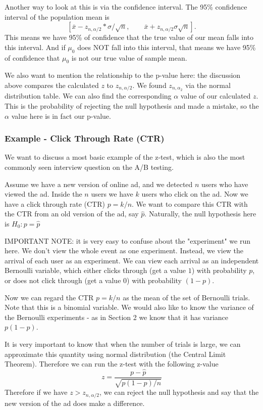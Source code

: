 \documentclass[12pt]{amsart}
\numberwithin{equation}{section}
\theoremstyle{plain}
\theoremstyle{definition}
\begin{document}
Another way to look at this is via the confidence interval. The 95\% confidence interval of the population mean is 
$$
[\bar x-z_{n,\alpha/2}*\sigma/\sqrt{n}, \qquad\bar x+z_{n,\alpha/2}\sigma\sqrt{n}].
$$
This means we have 95\% of confidence that the true value of our mean falls into this interval. And if $\mu_0$ does NOT fall into this interval, that means we have 95\% of confidence that $\mu_0$ is not our true value of sample mean.

We also want to mention the relationship to the p-value here: the discussion above compares the calculated $z$ to $z_{n,\alpha/2}$. We found $z_{n,\alpha_2}$ via the normal distribution table. We can also find the corresponding $\alpha$ value of our calculated $z$. This is the probability of rejecting the null hypothesis and made a mistake, so the $\alpha$ value here is in fact our p-value.

\subsubsection{Example - Click Through Rate (CTR)}

We want to discuss a most basic example of the z-test, which is also the most commonly seen interview question on the A/B testing. 

Assume we have a new version of online ad, and we detected $n$ users who have viewed the ad. Inside the $n$ users we have $k$ users who click on the ad. Now we have a click through rate (CTR) $p = k/n$. We want to compare this CTR with the CTR from an old version of the ad, say $\hat p$. Naturally, the null hypothesis here is $H_0: p = \hat p$

IMPORTANT NOTE: it is very easy to confuse about the "experiment" we run here. We don't view the whole event as one experiment. Instead, we view the arrival of each user as an experiment. We can view each arrival as an independent Bernoulli variable, which either clicks through (get a value $1$) with probability $p$, or does not click through (get a value $0$) with probability $(1-p)$.

Now we can regard the CTR $p = k/n$ as the mean of the set of Bernoulli trials. Note that this is a binomial variable. We would also like to know the variance of the Bernoulli experiments - as in Section 2 we know that it has variance $p(1-p)$.

It is very important to know that when the number of trials is large, we can approximate this quantity using normal distribution (the Central Limit Theorem). Therefore we can run the z-test with the following z-value
$$
z = \frac{p-\hat p}{\sqrt{p(1-p)/n}}
$$
Therefore if we have $z>z_{n,\alpha/2}$, we can reject the null hypothesis and say that the new version of the ad does make a difference.
\end{document}
